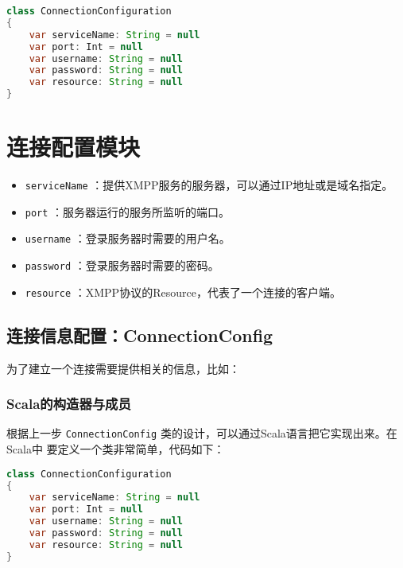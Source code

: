 \begin{lstlisting}[language=Java]
class ConnectionConfiguration
{
	var serviceName: String = null
	var port: Int = null 
	var username: String = null
	var password: String = null 
	var resource: String = null
}

\end{lstlisting}





\section{连接配置模块}



\begin{itemize}
	\item   \verb|serviceName| ：提供XMPP服务的服务器，可以通过IP地址或是域名指定。
	\item   \verb|port| ：服务器运行的服务所监听的端口。
	\item   \verb|username| ：登录服务器时需要的用户名。
	\item   \verb|password| ：登录服务器时需要的密码。
	\item   \verb|resource| ：XMPP协议的Resource，代表了一个连接的客户端。
\end{itemize}



\subsection{连接信息配置：ConnectionConfig}

为了建立一个连接需要提供相关的信息，比如：






\subsubsection{Scala的构造器与成员}

根据上一步  \verb|ConnectionConfig| 类的设计，可以通过Scala语言把它实现出来。在Scala中
要定义一个类非常简单，代码如下：




\begin{lstlisting}[language=Java]
class ConnectionConfiguration
{
	var serviceName: String = null
	var port: Int = null 
	var username: String = null
	var password: String = null 
	var resource: String = null
}

\end{lstlisting}



